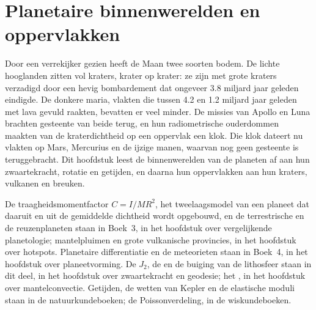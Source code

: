 \chapter{Planetaire binnenwerelden en oppervlakken}\label{ch:b3:planetary-interiors-surfaces}

Door een verrekijker gezien heeft de Maan twee soorten bodem. De lichte
hooglanden zitten vol kraters, krater op krater: ze zijn
met grote kraters verzadigd door een hevig bombardement dat ongeveer 3.8 miljard
jaar geleden eindigde. De donkere maria, vlakten die tussen 4.2 en 1.2
miljard jaar geleden met lava gevuld raakten, bevatten er veel minder. De missies van Apollo en Luna
brachten gesteente van beide terug, en hun radiometrische ouderdommen maakten
van de kraterdichtheid op een oppervlak een klok. Die klok dateert nu
vlakten op Mars, Mercurius en de ijzige manen, waarvan nog geen gesteente
is teruggebracht. Dit hoofdstuk leest de binnenwerelden van de planeten af aan hun
zwaartekracht, rotatie en getijden, en daarna hun oppervlakken aan hun kraters,
vulkanen en breuken.

\begin{recall}
De traagheidsmomentfactor $C = I/MR^2$, het tweelaagsmodel van een planeet
dat daaruit en uit de gemiddelde dichtheid wordt opgebouwd, en de terrestrische en de reuzenplaneten
staan in Boek~3, in het hoofdstuk over vergelijkende
planetologie; mantelpluimen en grote vulkanische provincies, in het hoofdstuk over
hotspots. Planetaire differentiatie en de meteorieten staan in Boek~4,
in het hoofdstuk over planeetvorming. De 
$J_2$, de  en de buiging van de lithosfeer staan in dit
deel, in het hoofdstuk over zwaartekracht en geodesie; het , in het
hoofdstuk over mantelconvectie. Getijden, de wetten van Kepler en de elastische
moduli staan in de natuurkundeboeken; de Poissonverdeling, in de
wiskundeboeken.
\end{recall}

